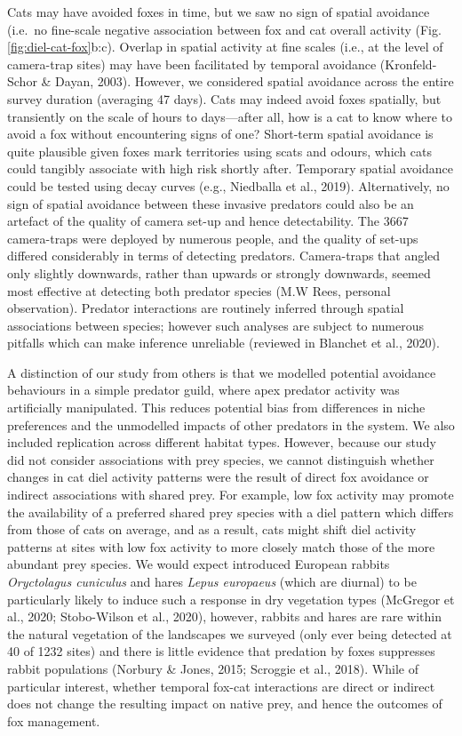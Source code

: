 \documentclass[]{elsarticle} %
\begin{document}
Cats may have avoided foxes in time, but we saw no sign of spatial avoidance (i.e.~no fine-scale negative association between fox and cat overall activity (Fig. \ref{fig:diel-cat-fox}b:c). Overlap in spatial activity at fine scales (i.e., at the level of camera-trap sites) may have been facilitated by temporal avoidance (Kronfeld-Schor \& Dayan, 2003). However, we considered spatial avoidance across the entire survey duration (averaging 47 days). Cats may indeed avoid foxes spatially, but transiently on the scale of hours to days---after all, how is a cat to know where to avoid a fox without encountering signs of one? Short-term spatial avoidance is quite plausible given foxes mark territories using scats and odours, which cats could tangibly associate with high risk shortly after. Temporary spatial avoidance could be tested using decay curves (e.g., Niedballa et al., 2019). Alternatively, no sign of spatial avoidance between these invasive predators could also be an artefact of the quality of camera set-up and hence detectability. The 3667 camera-traps were deployed by numerous people, and the quality of set-ups differed considerably in terms of detecting predators. Camera-traps that angled only slightly downwards, rather than upwards or strongly downwards, seemed most effective at detecting both predator species (M.W Rees, personal observation). Predator interactions are routinely inferred through spatial associations between species; however such analyses are subject to numerous pitfalls which can make inference unreliable (reviewed in Blanchet et al., 2020).

A distinction of our study from others is that we modelled potential avoidance behaviours in a simple predator guild, where apex predator activity was artificially manipulated. This reduces potential bias from differences in niche preferences and the unmodelled impacts of other predators in the system. We also included replication across different habitat types. However, because our study did not consider associations with prey species, we cannot distinguish whether changes in cat diel activity patterns were the result of direct fox avoidance or indirect associations with shared prey. For example, low fox activity may promote the availability of a preferred shared prey species with a diel pattern which differs from those of cats on average, and as a result, cats might shift diel activity patterns at sites with low fox activity to more closely match those of the more abundant prey species. We would expect introduced European rabbits \emph{Oryctolagus cuniculus} and hares \emph{Lepus europaeus} (which are diurnal) to be particularly likely to induce such a response in dry vegetation types (McGregor et al., 2020; Stobo-Wilson et al., 2020), however, rabbits and hares are rare within the natural vegetation of the landscapes we surveyed (only ever being detected at 40 of 1232 sites) and there is little evidence that predation by foxes suppresses rabbit populations (Norbury \& Jones, 2015; Scroggie et al., 2018). While of particular interest, whether temporal fox-cat interactions are direct or indirect does not change the resulting impact on native prey, and hence the outcomes of fox management.
\end{document}
